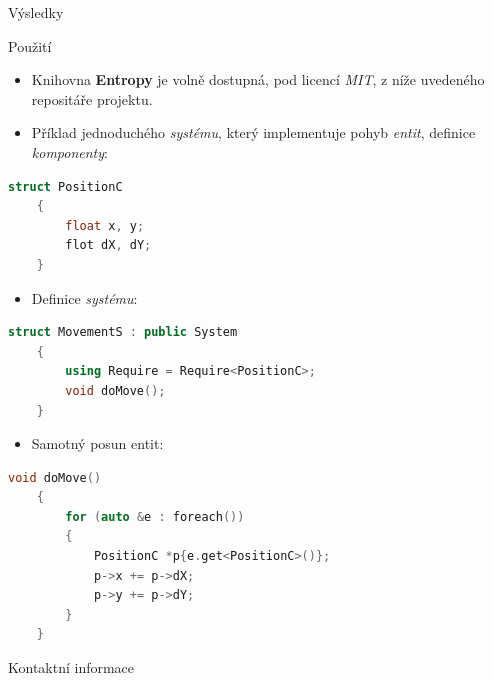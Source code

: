 \documentclass[final,hyperref={pdfpagelabels=false}]{beamer}
\begin{document}
\begin{frame}[t, fragile]
\begin{columns}[t]
\begin{column}{.465\textwidth}
\begin{block}{Výsledky}
\end{block}


\begin{block}{Použití}
	
	\begin{itemize}
		\item Knihovna \textbf{Entropy} je volně dostupná, pod licencí \emph{MIT}, z níže uvedeného repositáře projektu. 
		\item Příklad jednoduchého \emph{systému}, který implementuje pohyb \emph{entit}, definice \emph{komponenty}:
	\end{itemize}
	\begin{lstlisting}[backgroundcolor = \color{LstColor}, language = C++, xleftmargin = 0cm, framexleftmargin = 0em, tabsize=2]
	struct PositionC
	{
		float x, y;
		flot dX, dY;
	}
	\end{lstlisting}
	\begin{itemize}
		\item Definice \emph{systému}: 
	\end{itemize}
	\begin{lstlisting}[backgroundcolor = \color{LstColor}, language = C++, xleftmargin = 0cm, framexleftmargin = 0em, tabsize=2]
	struct MovementS : public System
	{
		using Require = Require<PositionC>;
		void doMove();
	}
	\end{lstlisting}
	\begin{itemize}
		\item Samotný posun entit: 
	\end{itemize}
	\begin{lstlisting}[backgroundcolor = \color{LstColor}, language = C++, xleftmargin = 0cm, framexleftmargin = 0em, tabsize=2]
	void doMove()
	{
		for (auto &e : foreach())
		{
			PositionC *p{e.get<PositionC>()};
			p->x += p->dX;
			p->y += p->dY;
		}
	}
	\end{lstlisting}
	
\end{block}



\vspace{1.2em}

\begin{block}{Kontaktní informace}
	

\end{block}
\end{column}
\end{columns}
\end{frame}
\end{document}
